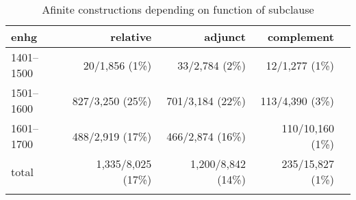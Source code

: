 \documentclass[output=paper,colorlinks,citecolor=brown]{langscibook}
\begin{document}
{\small
\begin{table}
  \centering
  \begin{tabular}{lrrrr}
    \lsptoprule
   \sc enhg & \sc relative & \sc adjunct & \sc complement \\
    \midrule
    1401--1500 & 20/1,856 (1\%) & 33/2,784 (2\%) & 12/1,277 (1\%)   \\
    1501--1600 & 827/3,250 (25\%) & 701/3,184 (22\%) & 113/4,390 (3\%) \\
    1601--1700 & 488/2,919 (17\%) & 466/2,874 (16\%) & 110/10,160 (1\%) \\
    \midrule
   \sc total & 1,335/8,025 (17\%) & 1,200/8,842 (14\%) & 235/15,827 (1\%)  \\
    \lspbottomrule
    \end{tabular}
   \caption{Afinite constructions depending on function of subclause   \label{table3}}
\end{table}
}
\end{document}
